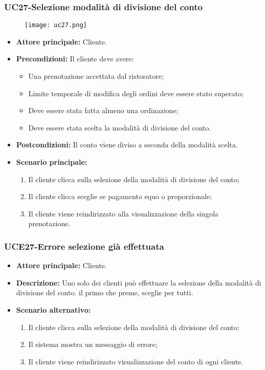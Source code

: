 
\subsubsection{UC27-Selezione modalità di divisione del conto}
\begin{figure}[h] \texttt{[image: uc27.png]} \end{figure}
\begin{itemize}
\item \textbf{Attore principale:} Cliente.
\item \textbf{Precondizioni:} Il cliente deve avere:
  \begin{itemize}
    \item Una prenotazione accettata dal ristoratore;
    \item Limite temporale di modifica degli ordini deve essere stato superato;
    \item Deve essere stata fatta almeno una ordinazione;
    \item Deve essere stata scelta la modalità di divisione del conto.
  \end{itemize}
\item \textbf{Postcondizioni:} Il conto viene diviso a seconda della modalità scelta.
\item \textbf{Scenario principale:}
\begin{enumerate}
    \item Il cliente clicca sulla selezione della modalità di divisione del conto;
    \item Il cliente clicca sceglie se pagamento equo o proporzionale;
    \item Il cliente viene reindirizzato alla visualizzazione della singola prenotazione.
\end{enumerate}
\end{itemize}

\subsubsection{UCE27-Errore selezione già effettuata}
\begin{itemize}
\item \textbf{Attore principale:} Cliente.
\item \textbf{Descrizione:} Uno solo dei clienti può effettuare la selezione della modalità di divisione del conto.
  il primo che preme, sceglie per tutti.
\item \textbf{Scenario alternativo:}
\begin{enumerate}
    \item Il cliente clicca sulla selezione della modalità di divisione del conto;
    \item Il sistema mostra un messaggio di errore;
    \item Il cliente viene reindirizzato visualizzazione del conto di ogni cliente.
\end{enumerate}
\end{itemize}

